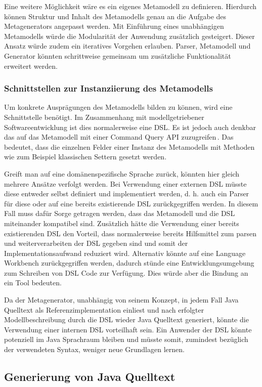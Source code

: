 \documentclass[12pt,oneside,a4paper,parskip]{scrbook}
\begin{document}
Eine weitere Möglichkeit wäre es ein eigenes Metamodell zu definieren. Hierdurch können Struktur und Inhalt des Metamodells genau an die Aufgabe des Metagenerators angepasst werden. Mit Einführung eines unabhängigen Metamodells würde die Modularität der Anwendung zusätzlich gesteigert. Dieser Ansatz würde zudem ein iteratives Vorgehen erlauben. Parser, Metamodell und Generator könnten schrittweise gemeinsam um zusätzliche Funktionalität erweitert werden.

\subsubsection{Schnittstellen zur Instanziierung des Metamodells}
Um konkrete Ausprägungen des Metamodells bilden zu können, wird eine Schnittstelle benötigt. Im Zusammenhang mit modellgetriebener Softwareentwicklung ist dies normalerweise eine DSL. Es ist jedoch auch denkbar das auf das Metamodell mit einer Command Query API zuzugreifen\,\cite[S. 343ff.]{fowler2010}. Das bedeutet, dass die einzelnen Felder einer Instanz des Metamodells mit Methoden wie zum Beispiel klassischen Settern gesetzt werden.

Greift man auf eine domänenspezifische Sprache zurück, könnten hier gleich mehrere Ansätze verfolgt werden. Bei Verwendung einer externen DSL müsste diese entweder selbst definiert und implementiert werden, d. h. auch ein Parser für diese oder auf eine bereits existierende DSL zurückgegriffen werden. In diesem Fall muss dafür Sorge getragen werden, dass das Metamodell und die DSL miteinander kompatibel sind. Zusätzlich hätte die Verwendung einer bereits existierenden DSL den Vorteil, dass normalerweise bereits Hilfsmittel zum parsen und weiterverarbeiten der DSL gegeben sind und somit der Implementationsaufwand reduziert wird. Alternativ könnte auf eine Language Workbench zurückgegriffen werden, dadurch stünde eine Entwicklungsumgebung zum Schreiben von DSL Code zur Verfügung. Dies würde aber die Bindung an ein Tool bedeuten.

Da der Metagenerator, unabhängig von seinem Konzept, in jedem Fall Java Quelltext als Referenzimplementation einliest und nach erfolgter Modellbeschreibung durch die DSL wieder Java Quelltext generiert, könnte die Verwendung einer internen DSL vorteilhaft sein. Ein Anwender der DSL könnte potenziell im Java Sprachraum bleiben und müsste somit, zumindest bezüglich der verwendeten Syntax, weniger neue Grundlagen lernen.

\subsection{Generierung von Java Quelltext}
\end{document}
